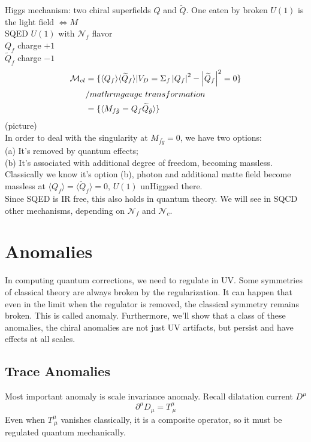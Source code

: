 \documentclass[type = bachelor]{fduthesis-en}
\begin{document}
Higgs mechanism: two chiral superfields $Q$ and $\widetilde{Q}$. One eaten by broken $U(1)$ is the light field $\Leftrightarrow M$\\
SQED $U(1)$ with $\mathcal{N}_f$ flavor\\
$Q_f$ charge $+1$\\
$\widetilde{Q}_f$ charge $-1$
\begin{align}
\notag
\mathcal{M}_{cl}&=\{\langle Q_f\rangle\langle\widetilde{Q}_f\rangle|V_D=\Sigma_f\left|Q_f\right|^2-\left|\widetilde{Q}_f\right|^2=0\}\\
\notag&/mathrm{gauge\ transformation}\\
&=\{\langle M_{f\tilde{g}}=Q_f\widetilde{Q}_{\tilde{g}}\rangle\}
\end{align}
(picture)\\
In order to deal with the singularity at $M_{f\tilde{g}}=0$, we have two options:\\ 
(a) It's removed by quantum effects; \\
(b) It's associated with additional degree of freedom, becoming massless.\\
Classically we know it's option (b), photon and additional matte field become massless at $\langle Q_f\rangle=\langle\widetilde{Q}_f\rangle=0$, $U(1)$ unHiggsed there.\\
Since SQED is IR free, this also holds in quantum theory. We will see in SQCD other mechanisms, depending on $\mathcal{N}_f$ and $\mathcal{N}_c$.
\section{Anomalies}
In computing quantum corrections, we need to regulate in UV. Some symmetries of classical theory are always broken by the regularization. It can happen that even in the limit when the regulator is removed, the classical symmetry remains broken. This is called anomaly. Furthermore, we'll show that a class of these anomalies, the chiral anomalies are not just UV artifacts, but persist and have effects at all scales.
\subsection{Trace Anomalies}
Most important anomaly is scale invariance anomaly. Recall dilatation current $D^\mu$
\begin{equation}
\partial^\mu D_\mu=T^\mu_{\ \mu}
\end{equation}
Even when $T^\mu_{\ \mu}$ vanishes classically, it is a composite operator, so it must be regulated quantum mechanically.
\end{document}
